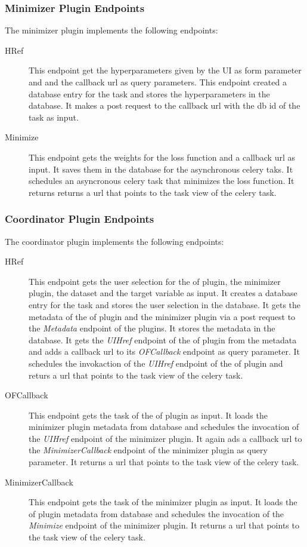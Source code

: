\documentclass[
  a4paper,  %
  twoside,  %
  bibliography=totoc,
  headsepline,
  cleardoublepage=empty,
  parskip=half,
  draft=false
]{scrbook}
\begin{document}
\subsubsection{Minimizer Plugin Endpoints}
\label{sec:minimizerPluginEndpoints}
The minimizer plugin implements the following endpoints:

\begin{description}
  \item[HRef] This endpoint get the hyperparameters given by the UI as form parameter and and the callback url as query parameters. This endpoint created a database entry for the task and stores the hyperparameters in the database. It makes a post request to the callback url with the db id of the task as input.
  \item[Minimize] This endpoint gets the weights for the loss function and a callback url as input. It saves them in the database for the asynchronous celery taks. It schedules an asyncronous celery task that minimizes the loss function. It returns returns a url that points to the task view of the celery task.
\end{description}

\subsubsection{Coordinator Plugin Endpoints}
\label{sec:coordinatorPluginEndpoints}
The coordinator plugin implements the following endpoints:

\begin{description}
  \item[HRef] This endpoint gets the user selection for the \gls{of} plugin, the minimizer plugin, the dataset and the target variable as input. It creates a database entry for the task and stores the user selection in the database.
  It gets the metadata of the \gls{of} plugin and the minimizer plugin via a post request to the \emph{Metadata} endpoint of the plugins. It stores the metadata in the database.
  It gets the \emph{UIHref} endpoint of the \gls{of} plugin from the metadata and adds a callback url to its \emph{OFCallback} endpoint as query parameter. It schedules the invokaction of the \emph{UIHref} endpoint of the \gls{of} plugin and returs a url that points to the task view of the celery task.
  \item[OFCallback] This endpoint gets the task of the \gls{of} plugin as input. It loads the minimizer plugin metadata from database and schedules the invocation of the \emph{UIHref} endpoint of the minimizer plugin. It again ads a callback url to the \emph{MinimizerCallback} endpoint of the minimizer plugin as query parameter. It returns a url that points to the task view of the celery task.
  \item[MinimizerCallback] This endpoint gets the task of the minimizer plugin as input.
  It loads the \gls{of} plugin metadata from database and schedules the invocation of the \emph{Minimize} endpoint of the minimizer plugin. It returns a url that points to the task view of the celery task.

\end{description}
\end{document}
